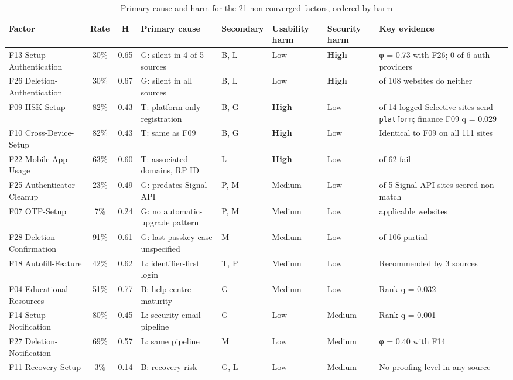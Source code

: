 \documentclass[letterpaper,twocolumn,10pt]{article}
\begin{document}
\begin{table}[t]\centering\scriptsize\setlength{\tabcolsep}{3pt}\caption{Primary cause and harm for the 21 non-converged factors, ordered by harm}\label{tab:4}
\begin{tabularx}{\textwidth}{>{\raggedright\arraybackslash}p{3.3cm}cc>{\raggedright\arraybackslash}X>{\raggedright\arraybackslash}p{1.1cm}ll>{\raggedright\arraybackslash}X}\toprule
\textbf{Factor} & \textbf{Rate} & \textbf{H} & \textbf{Primary cause} & \textbf{Secondary} & \textbf{Usability harm} & \textbf{Security harm} & \textbf{Key evidence} \\ \midrule
F13 Setup-Authentication & 30\% & 0.65 & G: silent in 4 of 5 sources & B, L & Low & \textbf{High} & φ = 0.73 with F26; 0 of 6 auth providers \\
F26 Deletion-Authentication & 30\% & 0.67 & G: silent in all sources & B, L & Low & \textbf{High} & 70 of 108 websites do neither \\
F09 HSK-Setup & 82\% & 0.43 & T: platform-only registration & B, G & \textbf{High} & Low & 13 of 14 logged Selective sites send \texttt{platform}; finance F09 q = 0.029 \\
F10 Cross-Device-Setup & 82\% & 0.43 & T: same as F09 & B, G & \textbf{High} & Low & Identical to F09 on all 111 sites \\
F22 Mobile-App-Usage & 63\% & 0.60 & T: associated domains, RP ID & L & \textbf{High} & Low & 23 of 62 fail \\
F25 Authenticator-Cleanup & 23\% & 0.49 & G: predates Signal API & P, M & Medium & Low & 2 of 5 Signal API sites scored non-match \\
F07 OTP-Setup & 7\% & 0.24 & G: no automatic-upgrade pattern & P, M & Medium & Low & 27 applicable websites \\
F28 Deletion-Confirmation & 91\% & 0.61 & G: last-passkey case unspecified & M & Medium & Low & 83 of 106 partial \\
F18 Autofill-Feature & 42\% & 0.62 & L: identifier-first login & T, P & Medium & Low & Recommended by 3 sources \\
F04 Educational-Resources & 51\% & 0.77 & B: help-centre maturity & G & Medium & Low & Rank q = 0.032 \\
F14 Setup-Notification & 80\% & 0.45 & L: security-email pipeline & G & Low & Medium & Rank q = 0.001 \\
F27 Deletion-Notification & 69\% & 0.57 & L: same pipeline & M & Low & Medium & φ = 0.40 with F14 \\
F11 Recovery-Setup & 3\% & 0.14 & B: recovery risk & G, L & Low & Medium & No proofing level in any source \\

\end{tabularx}
\end{table}
\end{document}
